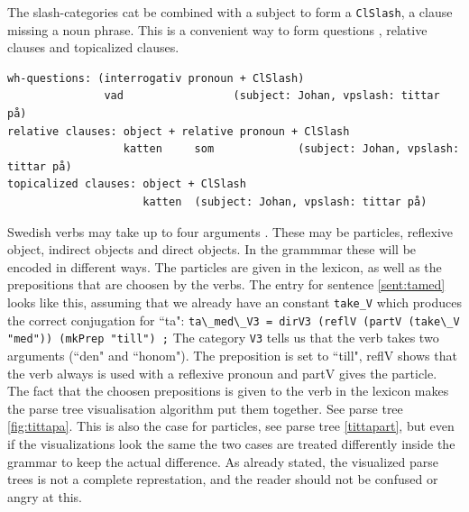 \documentclass{report}
\begin{document}
The slash-categories cat be combined with a subject to form a \verb-ClSlash-,
a clause missing a noun phrase. This is a convenient way to form questions ,
relative clauses
and topicalized clauses.
\begin{verbatim}
wh-questions: (interrogativ pronoun + ClSlash)
               vad                 (subject: Johan, vpslash: tittar på)
relative clauses: object + relative pronoun + ClSlash
                  katten     som             (subject: Johan, vpslash: tittar på)
topicalized clauses: object + ClSlash
                     katten  (subject: Johan, vpslash: tittar på)
\end{verbatim}

Swedish verbs may take up to four arguments \cite[p. 53]{stymne}.
\label{sent:tamed}
These may be particles, reflexive object, indirect objects and direct objects.
In the grammmar these will be encoded in different ways. The particles are
given in the lexicon, as well as the prepositions that are choosen by the verbs.
The entry for sentence \ref{sent:tamed} looks like this, assuming that we already
have an constant \verb-take_V- which produces the correct conjugation for ``ta":
\verb|ta\_med\_V3 = dirV3 (reflV (partV (take\_V "med")) (mkPrep "till") ;|
The category \verb-V3- tells us that the verb takes two arguments (``den" and ``honom").
The preposition is set to ``till", reflV shows that the verb always is used with a reflexive
pronoun and partV gives the particle.
The fact that the choosen prepositions is given to the verb in the lexicon makes the 
parse tree visualisation algorithm put them together. See parse tree \ref{fig:tittapa}.
This is also the case for particles, see parse tree \ref{tittapart}, but even if
the visualizations look the same the two cases are treated differently inside the grammar
to keep the actual difference.
As already stated, the visualized parse trees is not a complete represtation, and the reader
should not be confused or angry at this.\\

%
%
\end{document}
